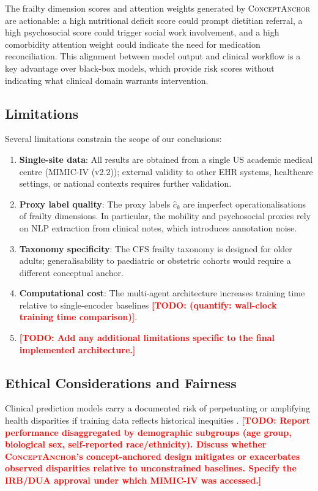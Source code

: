 \documentclass[review,12pt,authoryear]{elsarticle}
\newcommand{\todo}[1]{\textcolor{red}{\textbf{[TODO: #1]}}}
\newcommand{\modelname}{\textsc{ConceptAnchor}}
\newcommand{\dataset}{MIMIC-IV (v2.2)}
\begin{document}
The frailty dimension scores and attention weights generated by \modelname{} are actionable: a high nutritional deficit score could prompt dietitian referral, a high psychosocial score could trigger social work involvement, and a high comorbidity attention weight could indicate the need for medication reconciliation.
This alignment between model output and clinical workflow is a key advantage over black-box models, which provide risk scores without indicating what clinical domain warrants intervention.

\subsection{Limitations}

Several limitations constrain the scope of our conclusions:

\begin{enumerate}[leftmargin=*, label=\arabic*., noitemsep]
  \item \textbf{Single-site data}: All results are obtained from a single US academic medical centre (\dataset{}); external validity to other EHR systems, healthcare settings, or national contexts requires further validation.
  \item \textbf{Proxy label quality}: The proxy labels $\hat{c}_k$ are imperfect operationalisations of frailty dimensions. In particular, the mobility and psychosocial proxies rely on NLP extraction from clinical notes, which introduces annotation noise.
  \item \textbf{Taxonomy specificity}: The CFS frailty taxonomy is designed for older adults; generalisability to paediatric or obstetric cohorts would require a different conceptual anchor.
  \item \textbf{Computational cost}: The multi-agent architecture increases training time relative to single-encoder baselines \todo{(quantify: wall-clock training time comparison)}.
  \item \todo{Add any additional limitations specific to the final implemented architecture.}
\end{enumerate}

\subsection{Ethical Considerations and Fairness}

Clinical prediction models carry a documented risk of perpetuating or amplifying health disparities if training data reflects historical inequities \citep{obermeyer2019dissecting}.
\todo{Report performance disaggregated by demographic subgroups (age group, biological sex, self-reported race/ethnicity). Discuss whether \modelname's concept-anchored design mitigates or exacerbates observed disparities relative to unconstrained baselines. Specify the IRB/DUA approval under which MIMIC-IV was accessed.}
\end{document}
